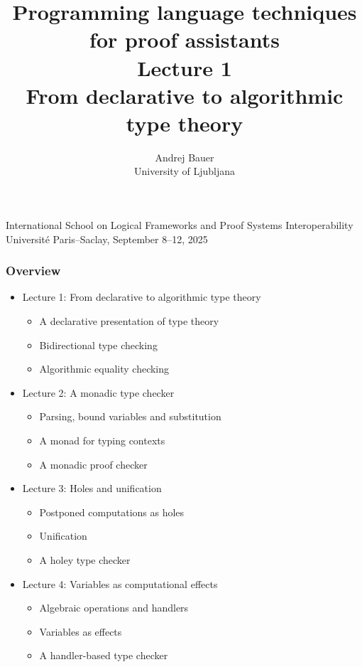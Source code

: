\documentclass[11pt,aspectratio=169]{beamer}
\title{Programming language techniques \\for proof assistants\\[2ex]Lecture 1\\ From declarative to algorithmic type theory}
\author{Andrej Bauer\\University of Ljubljana}
\date{}
\begin{document}
\begin{frame}
\hbox{}\vfil

\titlepage

\vfil

\begin{center}
\footnotesize
International School on Logical Frameworks and Proof Systems Interoperability \\
Université Paris--Saclay, September 8--12, 2025
\end{center}

\end{frame}


\begin{frame}
  \frametitle{Overview}

  \begin{itemize}
  \item Lecture 1: From declarative to algorithmic type theory
    \begin{itemize}\footnotesize
    \item A declarative presentation of type theory
    \item Bidirectional type checking
    \item Algorithmic equality checking
    \end{itemize}
  \item \pause
    Lecture 2: A monadic type checker
    \begin{itemize}\footnotesize
    \item Parsing, bound variables and substitution
    \item A monad for typing contexts
    \item A monadic proof checker
    \end{itemize}
  \item \pause
    Lecture 3: Holes and unification
    \begin{itemize}\footnotesize
    \item Postponed computations as holes
    \item Unification
    \item A holey type checker
    \end{itemize}
  \item \pause
    Lecture 4: Variables as computational effects
    \begin{itemize}\footnotesize
    \item Algebraic operations and handlers
    \item Variables as effects
    \item A handler-based type checker
    \end{itemize}
  \end{itemize}
\end{frame}
\end{document}
